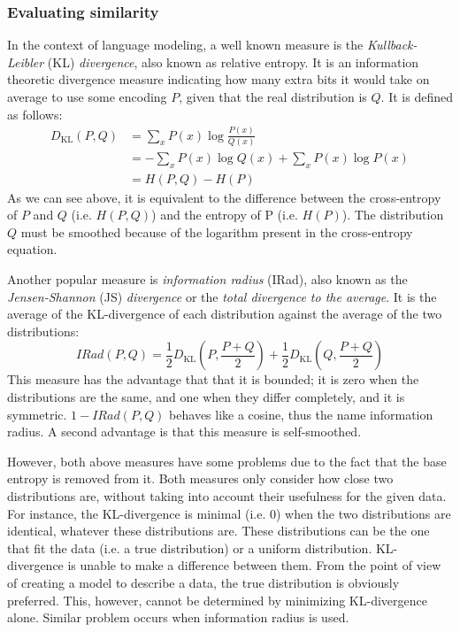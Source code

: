 \documentclass[english]{jnlp_1.4}
\begin{document}
\subsubsection{Evaluating similarity~}

In the context of language modeling, a well known measure is the \emph{Kullback-Leibler
}(KL)\emph{ divergence}, also known as relative entropy. It is an
information theoretic divergence measure indicating how many extra
bits it would take on average to use some encoding $P$, given that
the real distribution is $Q$. It is defined as follows:
\begin{align*}
D_{\mathrm{KL}}(P,Q) & = \sum_{x}P(x)\log\frac{P(x)}{Q(x)}\\
 & = -\sum_{x}P(x)\log Q(x)+\sum_{x}P(x)\log P(x)\\
 & = H(P,Q)-H(P)
\end{align*}
As we can see above, it is equivalent to the difference between the
cross-entropy of $P$ and $Q$ (i.e. $H(P,Q)$) and the entropy of
P (i.e. $H(P)$). The distribution $Q$ must be smoothed because of
the logarithm present in the cross-entropy equation. 

Another popular measure is \emph{information radius} (IRad), also
known as the \emph{Jensen-Shannon} (JS) \emph{divergence} or the \emph{total
divergence to the average}. It is the average of the KL-divergence
of each distribution against the average of the two distributions:
\[
IRad(P,Q) = \frac{1}{2}D_{\mathrm{KL}}\left(P,\frac{P+Q}{2}\right)+\frac{1}{2}D_{\mathrm{KL}}\left(Q,\frac{P+Q}{2}\right)
\]
 This measure has the advantage that that it is bounded; it is zero
when the distributions are the same, and one when they differ completely,
and it is symmetric. $1-IRad(P,Q)$ behaves like a cosine, thus the
name information radius. A second advantage is that this measure is
self-smoothed. 

However, both above measures have some problems due to the fact that
the base entropy is removed from it. Both measures only consider how
close two distributions are, without taking into account their usefulness
for the given data. For instance, the KL-divergence is minimal (i.e.
0) when the two distributions are identical, whatever these distributions
are. These distributions can be the one that fit the data (i.e. a
true distribution) or a uniform distribution. KL-divergence is unable
to make a difference between them. From the point of view of creating
a model to describe a data, the true distribution is obviously preferred.
This, however, cannot be determined by minimizing KL-divergence alone.
Similar problem occurs when information radius is used.
\end{document}
